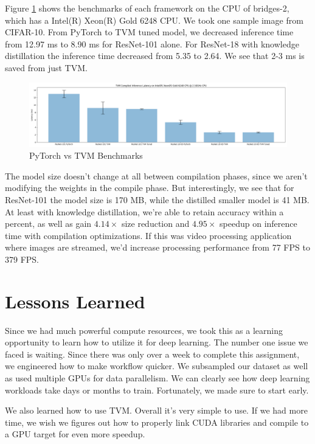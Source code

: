 \documentclass{article}
\begin{document}
Figure \ref{fig:tvm-benchmarks} shows the benchmarks of each framework on the CPU of bridges-2, which has a Intel(R) Xeon(R) Gold 6248 CPU. We took one sample image from CIFAR-10. From PyTorch to TVM tuned model, we decreased inference time from 12.97 ms to 8.90 ms for ResNet-101 alone. For ResNet-18 with knowledge distillation the inference time decreased from 5.35 to 2.64. We see that 2-3 ms is saved from just TVM.

\begin{figure}
	\centerline{\includegraphics[width=7in]{../proj4/figures/tvm_benchmarks.png}}
	\caption{PyTorch vs TVM Benchmarks}
	\label{fig:tvm-benchmarks}
\end{figure}

The model size doesn't change at all between compilation phases, since we aren't modifying the weights in the compile phase. But interestingly, we see that for ResNet-101 the model size is 170 MB, while the distilled smaller model is 41 MB. At least with knowledge distillation, we're able to retain accuracy within a percent, as well as gain $4.14\times$ size reduction and $4.95\times$ speedup on inference time with compilation optimizations. If this was video processing application where images are streamed, we'd increase processing performance from 77 FPS to 379 FPS.

\section{Lessons Learned}
Since we had much powerful compute resources, we took this as a learning opportunity to learn how to utilize it for deep learning. The number one issue we faced is waiting. Since there was only over a week to complete this assignment, we engineered how to make workflow quicker. We subsampled our dataset as well as used multiple GPUs for data parallelism. We can clearly see how deep learning workloads take days or months to train. Fortunately, we made sure to start early.

We also learned how to use TVM. Overall it's very simple to use. If we had more time, we wish we figures out how to properly link CUDA libraries and compile to a GPU target for even more speedup.
\end{document}
